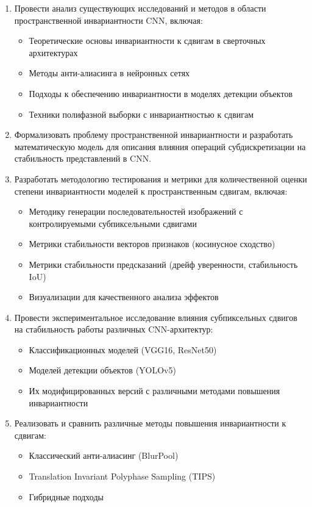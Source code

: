 \begin{enumerate}
    \item Провести анализ существующих исследований и методов в области пространственной инвариантности CNN, включая:
    \begin{itemize}
        \item Теоретические основы инвариантности к сдвигам в сверточных архитектурах
        \item Методы анти-алиасинга в нейронных сетях
        \item Подходы к обеспечению инвариантности в моделях детекции объектов
        \item Техники полифазной выборки с инвариантностью к сдвигам
    \end{itemize}
    
    \item Формализовать проблему пространственной инвариантности и разработать математическую модель для описания влияния операций субдискретизации на стабильность представлений в CNN.
    
    \item Разработать методологию тестирования и метрики для количественной оценки степени инвариантности моделей к пространственным сдвигам, включая:
    \begin{itemize}
        \item Методику генерации последовательностей изображений с контролируемыми субпиксельными сдвигами
        \item Метрики стабильности векторов признаков (косинусное сходство)
        \item Метрики стабильности предсказаний (дрейф уверенности, стабильность IoU)
        \item Визуализации для качественного анализа эффектов
    \end{itemize}
    
    \item Провести экспериментальное исследование влияния субпиксельных сдвигов на стабильность работы различных CNN-архитектур:
    \begin{itemize}
        \item Классификационных моделей (VGG16, ResNet50)
        \item Моделей детекции объектов (YOLOv5)
        \item Их модифицированных версий с различными методами повышения инвариантности
    \end{itemize}
    
    \item Реализовать и сравнить различные методы повышения инвариантности к сдвигам:
    \begin{itemize}
        \item Классический анти-алиасинг (BlurPool)
        \item Translation Invariant Polyphase Sampling (TIPS)
        \item Гибридные подходы
    \end{itemize}
    

\end{enumerate}
